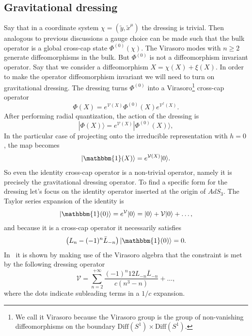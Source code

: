\documentclass{PoS}
\newcommand{\ket}[1]{|#1\rangle}
\newcommand{\LF}{\left(}
\newcommand{\RF}{\right)}
\begin{document}
 
\subsection{Gravitational dressing}

Say that in a coordinate system $\chi = (\tilde{y},\tilde{x}^\mu)$ the dressing is trivial. Then analogous to previous discussions a gauge choice can be made such that the bulk operator is a global cross-cap state $\Phi^{(0)}(\chi)$. The Virasoro modes with $n\geq 2$ generate diffeomorphisms in the bulk.  But $\Phi^{(0)}$ is not a diffeomorphism invariant operator. Say that we consider a diffeomorphism $X=\chi(X) + \xi(X)$. In order to make the operator diffeomorphism invariant we will need to turn on gravitational dressing. The dressing turns $\Phi^{(0)}$ into a Virasoro\footnote{ We call it Virasoro because the Virasoro group is the group of non-vanishing diffeomorphisms on the boundary $\text{Diff}(S^1) \times \text{Diff}(S^1)$.} cross-cap operator
\begin{equation}
\Phi(X) = e^{\mathcal{V}(X)}\Phi^{(0)}(X) e^{\mathcal{V}^\dagger (X)}.
\end{equation}
After performing radial quantization, the action of the dressing is
\begin{equation}
\ket{\Phi(X)} = e^{\mathcal{V}(X)} \ket{\Phi^{(0)}(X)},
\end{equation}
In the particular case of projecting onto the irreducible representation with $h=0$ , the map becomes
\begin{equation}
\ket{\mathbbm{1}(X)} = e^{\mathcal{V}(X)}\ket{0}.
\end{equation}
So even the identity cross-cap operator is a non-trivial operator, namely it is precisely the gravitational dressing operator. To find a specific form for the dressing let's focus on the identity operator inserted at the origin of $AdS_3$. The Taylor series expansion of the identity is
\begin{equation}
\ket{\mathbbm{1}(0)} = e^{\mathcal{V}}\ket{0} = \ket{0} + \mathcal{V}\ket{0} + \ldots,
\end{equation}
and because it is a cross-cap operator it necessarily satisfies
\begin{equation}
\LF L_n - (-1)^n \bar{L}_{-n}\RF \ket{\mathbbm{1}(0)} =0.
\label{eq:constraint1}
\end{equation}
In~\cite{Lewkowycz:2016ukf} it is shown by making use of the Virasoro algebra that the constraint is met by the following dressing operator
\begin{equation}
\mathcal{V} = \sum\limits_{n=2}^{+\infty} \frac{(-1)^n 12L_{-n}\bar{L}_{-n}}{c( n^3-n)}+\ldots,
\end{equation}
where the dots indicate subleading terms in a $1/c$ expansion.
\end{document}
